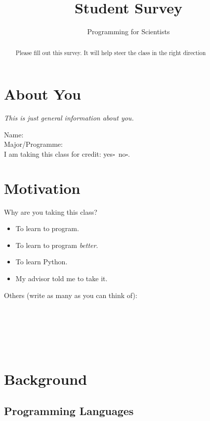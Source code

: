 \documentclass[article,twoside]{memoir}
\title{Student Survey}
\author{Programming for Scientists}
\newcommand*{\fillunderscore}{~\hrulefill}
\newcommand*{\checkbox}{$\square$}
\newcommand*{\yesno}{\hfill\mbox{yes\checkbox~no\checkbox}}
\newcommand{\header}[1]{\textsl{#1}}
\begin{document}
\maketitle
\begin{abstract}
Please fill out this survey. It will help steer the class in the right direction
\end{abstract}

\chapter{About You}

\header{This is just general information about you.}

Name: \fillunderscore\\
Major/Programme: \fillunderscore\\
I am taking this class for credit: \yesno.

\chapter{Motivation}

Why are you taking this class?
\begin{itemize}[\checkbox]
\item To learn to program.
\item To learn to program \emph{better}.
\item To learn Python.
\item My advisor told me to take it.
\end{itemize}

Others (write as many as you can think of): \fillunderscore\par
\fillunderscore\par
\fillunderscore\par
\fillunderscore

\chapter{Background}

\section{Programming Languages}
\end{document}
